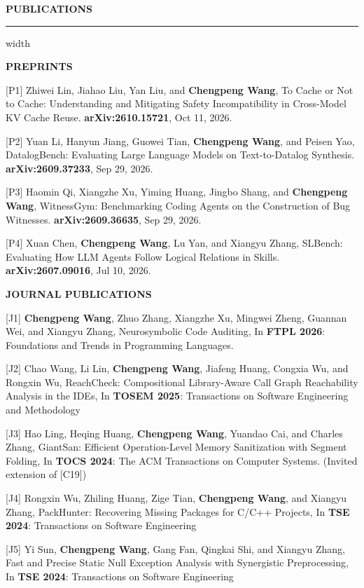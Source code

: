 \documentclass[centered]{resume}
\newlength{\cvsectiongap}
\newenvironment{rSection}[1]{%
  \par\Needspace{5\baselineskip}\addvspace{\cvsectiongap}
  {\bfseries \MakeUppercase{#1}}\vspace{0.65em}%
  \noindent\hrule width \linewidth\vspace{-0.45em}\par
}{\par}
\newenvironment{subsection*}[4]{%
  \par\Needspace{5\baselineskip}\noindent #1\par\nobreak
}{}
\begin{document}
\begin{resume}
\begin{rSection}{Publications}
\begin{subsection*}{\textbf{PREPRINTS}}{}{}{}
\vspace{-1.5mm}

[P1] Zhiwei Lin, Jiahao Liu, Yan Liu, and \textbf{Chengpeng Wang}, To Cache or Not to Cache: Understanding and Mitigating Safety Incompatibility in Cross-Model KV Cache Reuse. \textbf{arXiv:2610.15721}, Oct 11, 2026.

[P2] Yuan Li, Hanyun Jiang, Guowei Tian, \textbf{Chengpeng Wang}, and Peisen Yao, DatalogBench: Evaluating Large Language Models on Text-to-Datalog Synthesis. \textbf{arXiv:2609.37233}, Sep 29, 2026.

[P3] Haomin Qi, Xiangzhe Xu, Yiming Huang, Jingbo Shang, and \textbf{Chengpeng Wang}, WitnessGym: Benchmarking Coding Agents on the Construction of Bug Witnesses. \textbf{arXiv:2609.36635}, Sep 29, 2026.

[P4] Xuan Chen, \textbf{Chengpeng Wang}, Lu Yan, and Xiangyu Zhang, SLBench: Evaluating How LLM Agents Follow Logical Relations in Skills. \textbf{arXiv:2607.09016}, Jul 10, 2026.

\end{subsection*}

\begin{subsection*}{\textbf{JOURNAL PUBLICATIONS}}{}{}{}
\vspace{-1.5mm}

[J1] \textbf{Chengpeng Wang}, Zhuo Zhang, Xiangzhe Xu, Mingwei Zheng, Guannan Wei, and Xiangyu Zhang, Neurosymbolic Code Auditing, In \textbf{FTPL 2026}: Foundations and Trends in Programming Languages.

[J2] Chao Wang, Li Lin, \textbf{Chengpeng Wang}, Jiafeng Huang, Congxia Wu, and Rongxin Wu,
ReachCheck: Compositional Library-Aware Call Graph Reachability Analysis in the IDEs, In \textbf{TOSEM 2025}: Transactions on Software Engineering and Methodology

[J3] Hao Ling, Heqing Huang, \textbf{Chengpeng Wang}, Yuandao Cai, and Charles Zhang, GiantSan: Efficient Operation-Level Memory Sanitization with Segment Folding, In \textbf{TOCS 2024}: The ACM Transactions on Computer Systems. (Invited extension of [C19])

[J4] Rongxin Wu, Zhiling Huang, Zige Tian, \textbf{Chengpeng Wang}, and Xiangyu Zhang, PackHunter: Recovering Missing Packages for C/C++ Projects, In \textbf{TSE 2024}: Transactions on Software Engineering

[J5] Yi Sun, \textbf{Chengpeng Wang}, Gang Fan, Qingkai Shi, and Xiangyu Zhang, Fast and Precise Static Null Exception Analysis with Synergistic Preprocessing, In \textbf{TSE 2024}: Transactions on Software Engineering


\end{subsection*}
\end{rSection}
\end{resume}
\end{document}

